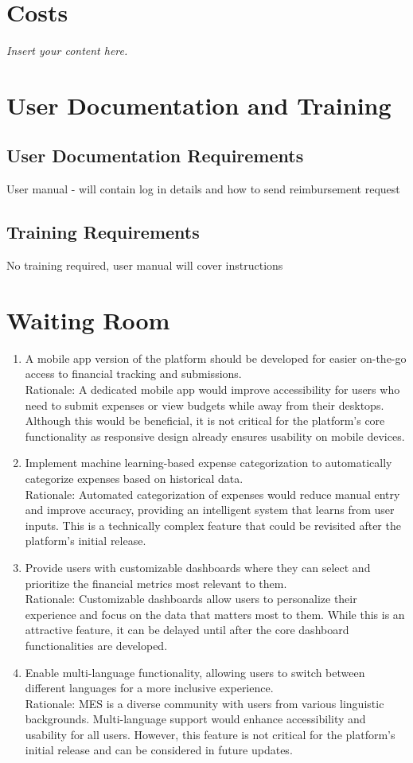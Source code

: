 \documentclass[12pt]{article}
\newcommand{\lips}{\textit{Insert your content here.}}
\begin{document}
\section{Costs}
\lips
\section{User Documentation and Training}
\subsection{User Documentation Requirements}
User manual - will contain log in details and how to send reimbursement request

\subsection{Training Requirements}
No training required, user manual will cover instructions


\section{Waiting Room}
\begin{enumerate}
  \item A mobile app version of the platform should be developed for easier on-the-go access to financial tracking and submissions. \\
  Rationale: A dedicated mobile app would improve accessibility for users who need to submit expenses or view budgets while away from their desktops. Although this would be beneficial, it is not critical for the platform's core functionality as responsive design already ensures usability on mobile devices.
  \item Implement machine learning-based expense categorization to automatically categorize expenses based on historical data. \\
  Rationale: Automated categorization of expenses would reduce manual entry and improve accuracy, providing an intelligent system that learns from user inputs. This is a technically complex feature that could be revisited after the platform's initial release.
  \item Provide users with customizable dashboards where they can select and prioritize the financial metrics most relevant to them. \\
  Rationale: Customizable dashboards allow users to personalize their experience and focus on the data that matters most to them. While this is an attractive feature, it can be delayed until after the core dashboard functionalities are developed.
  \item Enable multi-language functionality, allowing users to switch between different languages for a more inclusive experience. \\
  Rationale: MES is a diverse community with users from various linguistic backgrounds. Multi-language support would enhance accessibility and usability for all users. However, this feature is not critical for the platform's initial release and can be considered in future updates.
\end{enumerate}
\end{document}

